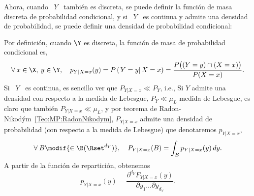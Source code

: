 Ahora, cuando  \ $Y$ \ tambi\'en es  discreta, se puede definir  la funci\'on de
masa discreta de probabilidad condicional, y si \ $Y$ \ es continua y admite una
densidad  de  probabilidad,  se  puede  definir  una  densidad  de  probabilidad condicional:
%
\begin{definicion}
\label{Def:MP:ReparticionCondicionalDiscreta}
%
  Por  definici\'on,  cuando  $\Y$  es   discreta,  la  funci\'on  de  masa  de
  probabilidad condicional  es,
  \[
  \forall \: x \in \X, \: y \in \Y, \quad p_{Y|X=x}(y) = P\left( \left. Y = y \right|
  X  =  x \right)  =  \frac{P\big(  (Y  = y)  \cap  (X =  x) \big)}{P(X = x)}.
  \]
  Si  \ $Y$  \  es continua,  es sencillo  ver  que $P_{Y|X=x}  \ll P_Y$,  i.e.,
     Si $Y$ admite una densidad con respecto  a la medida de
    Lebesgue,  $P_Y  \ll \mu_L$  medida  de  Lebesgue,  es claro  que  tambi\'en
    $P_{Y|X=x}       \ll       \mu_L$,        y       por       teorema       de
    Radon-Nikod\'ym~\ref{Teo:MP:RadonNikodym},  $P_{Y|X=x}$ admite  una densidad
    de  probabilidad (con  respecto a  la  medida de  Lebesgue) que  denotaremos
    $p_{Y|X=x}$,
  \[
  \forall  \:  B  \modif{\in   \B(\Rset^{d_Y})},  \quad  P_{Y|X=x}(B)  =  \int_B
  p_{Y|X=x}(y) \, dy.
  \]
  A partir de la funci\'on de repartici\'on, obtenemos
  \[
  p_{Y|X=x}(y) = \frac{\partial^{d_Y} F_{Y|X=x}(y)}{\partial y_1 \ldots \partial
    y_{d_Y}}.
  \]
\end{definicion}


